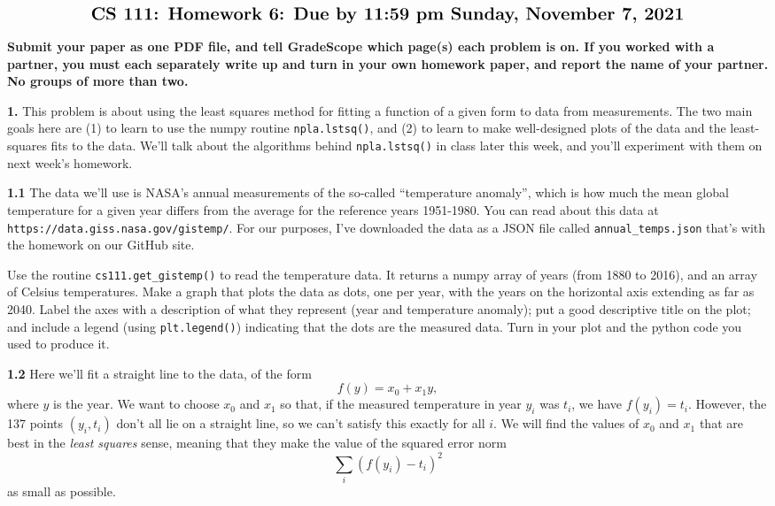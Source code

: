 \documentclass[11pt]{article}
\begin{document}
$$\mbox{\Large \bf CS 111: Homework 6: Due by 11:59 pm Sunday, November 7, 2021}$$
\par\smallskip\noindent
{\bf Submit your paper as one PDF file,
and tell GradeScope which page(s) each problem is on.
If you worked with a partner, 
you must each separately write up and turn in your own homework paper, 
and report the name of your partner.
No groups of more than two.
}

\par\bigskip
{\bf 1.}
This problem is about using the least squares method for fitting a function of a given
form to data from measurements. The two main goals here are (1) to learn to use the
numpy routine {\tt npla.lstsq()}, and (2) to learn to make well-designed plots of the
data and the least-squares fits to the data. We'll talk about the algorithms behind
{\tt npla.lstsq()} in class later this week, and you'll experiment with them on next
week's homework.

\par\medskip
{\bf 1.1}
The data we'll use is NASA's annual measurements of the so-called ``temperature anomaly'',
which is how much the mean global temperature for a given year differs from the average
for the reference years 1951-1980. You can read about this data at 
{\tt https://data.giss.nasa.gov/gistemp/}. For our purposes, I've downloaded the data
as a JSON file called {\tt annual\_temps.json} that's with the homework on our GitHub site.

Use the routine {\tt cs111.get\_gistemp()} to read the temperature data. 
It returns a numpy array of years (from 1880 to 2016), and an array of Celsius temperatures. 
Make a graph that plots the data as dots, one per year, 
with the years on the horizontal axis extending as far as 2040. 
Label the axes with a description of what they represent (year and temperature anomaly); 
put a good descriptive title on the plot; 
and include a legend (using {\tt plt.legend()}) indicating that the dots are the measured data. 
Turn in your plot and the python code you used to produce it.

\par\medskip
{\bf 1.2}
Here we'll fit a straight line to the data, of the form 
$$f(y) = x_0 + x_1y,$$
where $y$ is the year.
We want to choose $x_0$ and $x_1$ so that,
if the measured temperature in year $y_i$ was $t_i$, 
we have $f(y_i) = t_i$. 
However, the 137 points $(y_i, t_i)$ don't all lie on a straight line,
so we can't satisfy this exactly for all $i$.
We will find the values of $x_0$ and $x_1$ that are best in the
{\em least squares} sense, meaning that they make the value of
the squared error norm
$$\sum_i (f(y_i) - t_i)^2$$
as small as possible.
\end{document}
